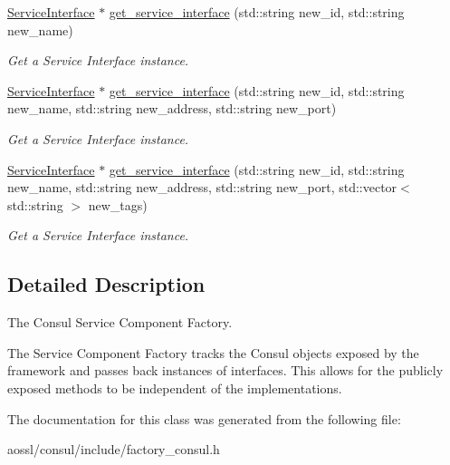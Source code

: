 \begin{DoxyCompactItemize}
\item 
\hyperlink{classServiceInterface}{Service\+Interface} $\ast$ \hyperlink{classConsulComponentFactory_afc7fcf16ac25fa995c76a6895468d382}{get\+\_\+service\+\_\+interface} (std\+::string new\+\_\+id, std\+::string new\+\_\+name)\hypertarget{classConsulComponentFactory_afc7fcf16ac25fa995c76a6895468d382}{}\label{classConsulComponentFactory_afc7fcf16ac25fa995c76a6895468d382}

\begin{DoxyCompactList}\small\item\em Get a Service Interface instance. \end{DoxyCompactList}\item 
\hyperlink{classServiceInterface}{Service\+Interface} $\ast$ \hyperlink{classConsulComponentFactory_a2010611751cd0cf748cf66b718f85e85}{get\+\_\+service\+\_\+interface} (std\+::string new\+\_\+id, std\+::string new\+\_\+name, std\+::string new\+\_\+address, std\+::string new\+\_\+port)\hypertarget{classConsulComponentFactory_a2010611751cd0cf748cf66b718f85e85}{}\label{classConsulComponentFactory_a2010611751cd0cf748cf66b718f85e85}

\begin{DoxyCompactList}\small\item\em Get a Service Interface instance. \end{DoxyCompactList}\item 
\hyperlink{classServiceInterface}{Service\+Interface} $\ast$ \hyperlink{classConsulComponentFactory_a8d96aeb99437d089204283f6e30b5b4a}{get\+\_\+service\+\_\+interface} (std\+::string new\+\_\+id, std\+::string new\+\_\+name, std\+::string new\+\_\+address, std\+::string new\+\_\+port, std\+::vector$<$ std\+::string $>$ new\+\_\+tags)\hypertarget{classConsulComponentFactory_a8d96aeb99437d089204283f6e30b5b4a}{}\label{classConsulComponentFactory_a8d96aeb99437d089204283f6e30b5b4a}

\begin{DoxyCompactList}\small\item\em Get a Service Interface instance. \end{DoxyCompactList}\end{DoxyCompactItemize}


\subsection{Detailed Description}
The Consul Service Component Factory. 

The Service Component Factory tracks the Consul objects exposed by the framework and passes back instances of interfaces. This allows for the publicly exposed methods to be independent of the implementations. 

The documentation for this class was generated from the following file\+:\begin{DoxyCompactItemize}
\item 
aossl/consul/include/factory\+\_\+consul.\+h\end{DoxyCompactItemize}
